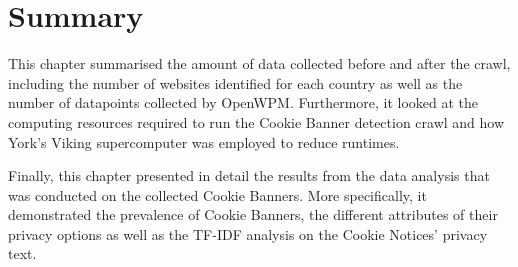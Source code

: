 \documentclass[../main.tex]{subfiles}
\begin{document}
\section{Summary}
This chapter summarised the amount of data collected before and after the crawl, including the number of websites identified for each country as well as the number of datapoints collected by OpenWPM. Furthermore, it looked at the computing resources required to run the Cookie Banner detection crawl and how York’s Viking supercomputer was employed to reduce runtimes.

Finally, this chapter presented in detail the results from the data analysis that was conducted on the collected Cookie Banners. More specifically, it demonstrated the prevalence of Cookie Banners, the different attributes of their privacy options as well as the TF-IDF analysis on the Cookie Notices’ privacy text.
\end{document}
